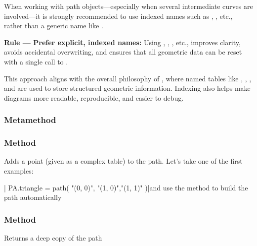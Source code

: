 When working with path objects—especially when several intermediate curves are involved—it is strongly recommended to use indexed names such as , , etc., rather than a generic name like .

\begin{mybox}
\textbf{Rule — Prefer explicit, indexed names:}
Using , , , etc., improves clarity, avoids accidental overwriting, and ensures that all geometric data can be reset with a single call to .
\end{mybox}

This approach aligns with the overall philosophy of , where named tables like , , , and  are used to store structured geometric information. Indexing also helps make diagrams more readable, reproducible, and easier to debug.


\subsubsection{Metamethod }

\subsubsection{Method }
\label{ssub:method_tkzmeth_path_add__point}

Adds a point (given as a complex table) to the path. Let's take one of the first examples:

| PA.triangle = path({ "(0, 0)", "(1, 0)","(1, 1)" })|and use the method to build the path automatically

\begin{tkzexample}[latex=.3\textwidth]
\end{tkzexample}

\subsubsection{Method }
\label{ssub:method_tkzmeth_path_copy}

Returns a deep copy of the path

\begin{tkzexample}[latex=.3\textwidth]
\end{tkzexample}

